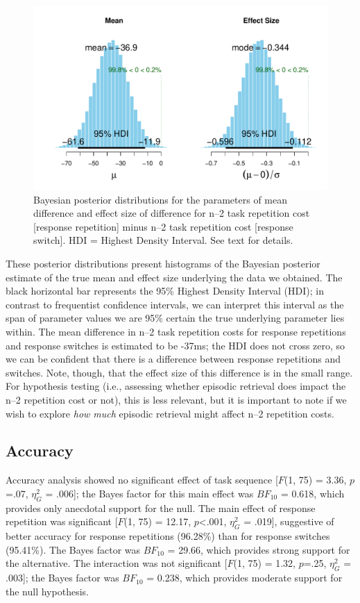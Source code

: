 \documentclass[a4paper, man, natbib]{apa6}
\begin{document}
\begin{figure}
\begin{center}
\includegraphics[width =\textwidth]{Images/bayesParameter.pdf}
\caption{Bayesian posterior distributions for the parameters of mean difference and effect size of difference for n--2 task repetition cost [response repetition] minus n--2 task repetition cost [response switch]. HDI = Highest Density Interval. See text for details.}
\label{fig:bayesParameter}
\end{center}
\end{figure}

These posterior distributions present histograms of the Bayesian posterior estimate of the true mean and effect size underlying the data we obtained. The black horizontal bar represents the 95\% Highest Density Interval (HDI); in contrast to frequentist confidence intervals, we can interpret this interval as the span of parameter values we are 95\% certain the true underlying parameter lies within. The mean difference in n--2 task repetition costs for response repetitions and response switches is estimated to be -37ms; the HDI does not cross zero, so we can be confident that there is a difference between response repetitions and switches. Note, though, that the effect size of this difference is in the small range. For hypothesis testing (i.e., assessing whether episodic retrieval does impact the n--2 repetition cost or not), this is less relevant, but it is important to note if we wish to explore \emph{how much} episodic retrieval might affect n--2 repetition costs.

\subsection{Accuracy}
Accuracy analysis showed no significant effect of task sequence [$F$(1, 75) = 3.36, $p$=.07, $\eta_G^2$ = .006]; the Bayes factor for this main effect was $BF_{10}$ = 0.618, which provides only anecdotal support for the null. The main effect of response repetition was significant [$F$(1, 75) = 12.17, $p$<.001, $\eta_G^2$ = .019], suggestive of better accuracy for response repetitions (96.28\%) than for response switches (95.41\%). The Bayes factor was $BF_{10}$ = 29.66, which provides strong support for the alternative. The interaction was not significant [$F$(1, 75) = 1.32, $p$=.25, $\eta_G^2$ = .003]; the Bayes factor was $BF_{10}$ = 0.238, which provides moderate support for the null hypothesis.
\end{document}

